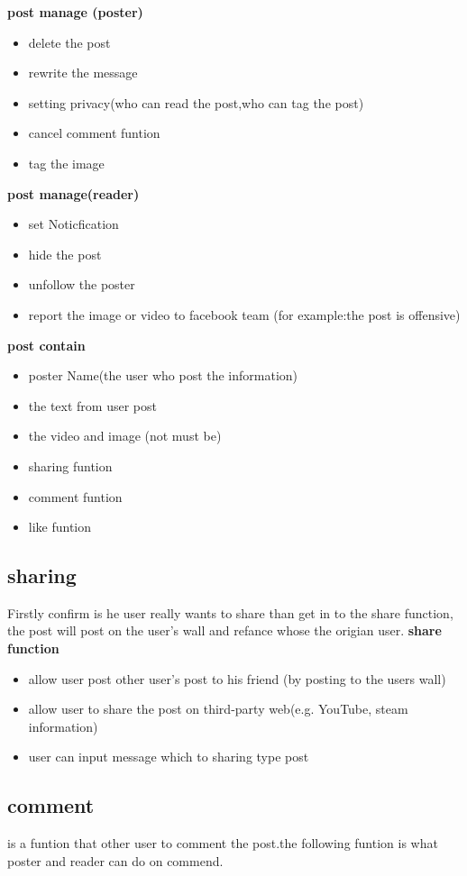 \textbf{post manage (poster)}
\begin{itemize}
\item delete the post
\item rewrite the message
\item setting privacy(who can read the post,who can tag the post)
\item cancel comment funtion
\item tag the image 
\end{itemize}

\textbf{post manage(reader)}
\begin{itemize}
\item set Noticfication
\item hide the post 
\item unfollow the poster
\item report the image or video to facebook team (for example:the post is
      offensive)
\end{itemize}

\textbf{post contain}
\begin{itemize}
\item poster Name(the user who post the information)
\item the text from user post
\item the video and image (not must be)
\item sharing funtion
\item comment funtion
\item like funtion
\end{itemize}


\subsection{sharing}
Firstly confirm is he user really wants to share than get in to the share
function, the post will post on the user's wall and refance whose the origian
user.
\textbf{share function}
\begin{itemize}
\item allow user post other user's post to his friend (by posting to the users
      wall)
\item allow user to share the post on third-party web(e.g. YouTube, steam
      information)
\item user can input message which to sharing type post 
\end{itemize}



\subsection{comment}
is a funtion that other user to comment the post.the following funtion is what
poster and reader can do on commend.

